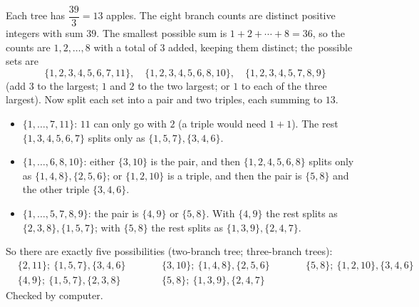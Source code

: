 Each tree has $\dfrac{39}{3}=13$ apples. The eight branch counts are distinct positive integers with sum $39$. The smallest possible sum is $1+2+\cdots+8=36$, so the counts are $1,2,\dots,8$ with a total of $3$ added, keeping them distinct; the possible sets are
\[
\{1,2,3,4,5,6,7,11\},\quad \{1,2,3,4,5,6,8,10\},\quad \{1,2,3,4,5,7,8,9\}
\]
(add $3$ to the largest; $1$ and $2$ to the two largest; or $1$ to each of the three largest). Now split each set into a pair and two triples, each summing to $13$.
\begin{itemize}
\item $\{1,\dots,7,11\}$: $11$ can only go with $2$ (a triple would need $1+1$). The rest $\{1,3,4,5,6,7\}$ splits only as $\{1,5,7\},\{3,4,6\}$.
\item $\{1,\dots,6,8,10\}$: either $\{3,10\}$ is the pair, and then $\{1,2,4,5,6,8\}$ splits only as $\{1,4,8\},\{2,5,6\}$; or $\{1,2,10\}$ is a triple, and then the pair is $\{5,8\}$ and the other triple $\{3,4,6\}$.
\item $\{1,\dots,5,7,8,9\}$: the pair is $\{4,9\}$ or $\{5,8\}$. With $\{4,9\}$ the rest splits as $\{2,3,8\},\{1,5,7\}$; with $\{5,8\}$ the rest splits as $\{1,3,9\},\{2,4,7\}$.
\end{itemize}
So there are exactly five possibilities (two-branch tree; three-branch trees):
\[
\boxed{\begin{aligned}
&\{2,11\};\ \{1,5,7\},\{3,4,6\}\qquad &&\{3,10\};\ \{1,4,8\},\{2,5,6\}\qquad &&\{5,8\};\ \{1,2,10\},\{3,4,6\}\\
&\{4,9\};\ \{1,5,7\},\{2,3,8\}\qquad &&\{5,8\};\ \{1,3,9\},\{2,4,7\}
\end{aligned}}
\]
Checked by computer.
